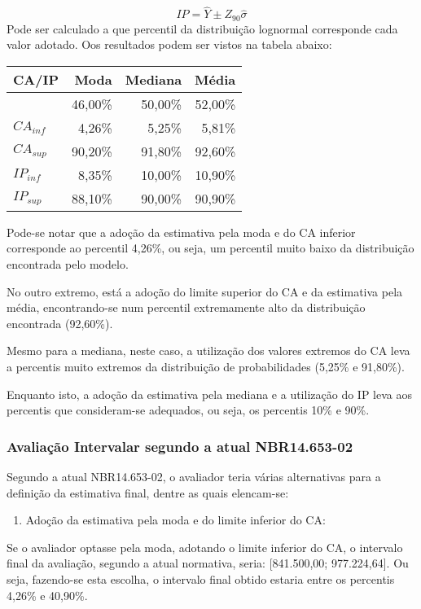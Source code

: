 \documentclass[a4paper, 12pt]{article}
\providecommand{\tightlist}{%
  \setlength{\itemsep}{0pt}\setlength{\parskip}{0pt}}
\begin{document}
\[IP = \hat{Y} \pm Z_{90}\hat{\sigma}\] Pode ser calculado a que
percentil da distribuição lognormal corresponde cada valor adotado. Oos
resultados podem ser vistos na tabela abaixo:

\begin{longtable}[]{@{}lrrr@{}}
\toprule
CA/IP & Moda & Mediana & Média\tabularnewline
\midrule
\endhead
& 46,00\% & 50,00\% & 52,00\%\tabularnewline
\(CA_{inf}\) & 4,26\% & 5,25\% & 5,81\%\tabularnewline
\(CA_{sup}\) & 90,20\% & 91,80\% & 92,60\%\tabularnewline
\(IP_{inf}\) & 8,35\% & 10,00\% & 10,90\%\tabularnewline
\(IP_{sup}\) & 88,10\% & 90,00\% & 90,90\%\tabularnewline
\bottomrule
\end{longtable}

Pode-se notar que a adoção da estimativa pela moda e do CA inferior
corresponde ao percentil 4,26\%, ou seja, um percentil muito baixo da
distribuição encontrada pelo modelo.

No outro extremo, está a adoção do limite superior do CA e da estimativa
pela média, encontrando-se num percentil extremamente alto da
distribuição encontrada (92,60\%).

Mesmo para a mediana, neste caso, a utilização dos valores extremos do
CA leva a percentis muito extremos da distribuição de probabilidades
(5,25\% e 91,80\%).

Enquanto isto, a adoção da estimativa pela mediana e a utilização do IP
leva aos percentis que consideram-se adequados, ou seja, os percentis
10\% e 90\%.

\hypertarget{avaliacao-intervalar-segundo-a-atual-nbr14.653-02}{%
\subsubsection{Avaliação Intervalar segundo a atual
NBR14.653-02}\label{avaliacao-intervalar-segundo-a-atual-nbr14.653-02}}

Segundo a atual NBR14.653-02, o avaliador teria várias alternativas para
a definição da estimativa final, dentre as quais elencam-se:

\begin{enumerate}
\def\labelenumi{\arabic{enumi}.}
\tightlist
\item
  Adoção da estimativa pela moda e do limite inferior do CA:
\end{enumerate}

Se o avaliador optasse pela moda, adotando o limite inferior do CA, o
intervalo final da avaliação, segundo a atual normativa, seria:
{[}841.500,00; 977.224,64{]}. Ou seja, fazendo-se esta escolha, o
intervalo final obtido estaria entre os percentis 4,26\% e 40,90\%.
\end{document}
